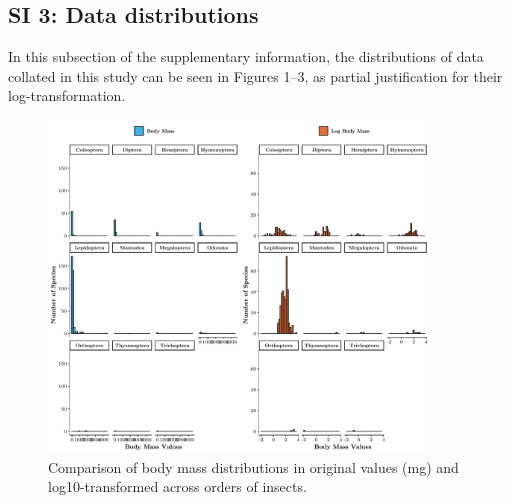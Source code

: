 \documentclass[11pt]{article}
\begin{document}
\subsection*{SI 3: Data distributions}
In this subsection of the supplementary information, the distributions of data collated in this study can be seen in Figures 1--3, as partial justification for their log-transformation.

\vspace{1cm}

\setcounter{figure}{0}   
\begin{figure}[H]
    \justifying
    \includegraphics[width=0.9\textwidth]{figures/Mass_Distributions.pdf}
    \caption{Comparison of body mass distributions in original values (mg) and log10-transformed across orders of insects.}
    \label{fig:mass-distributions}
\end{figure}
\end{document}
